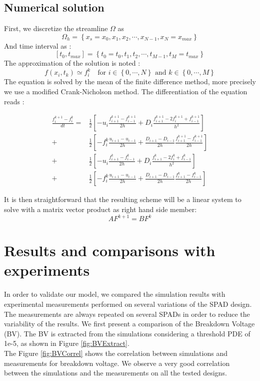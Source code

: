 \documentclass[10pt,a4paper,twocolumn]{article}
\begin{document}
\subsection{Numerical solution}
First, we discretize the streamline $\Omega$ as \[\Omega_h = \left\lbrace x_s = x_0, x_1, x_2, \cdots, x_{N-1}, x_N = x_{max} \right\rbrace \]
And time interval as : 
\[[t_0, t_{max}] = \left\lbrace t_0 = t_0, t_1, t_2, \cdots, t_{M-1}, t_M = t_{max} \right\rbrace \]
The approximation of the solution is noted :
 \[f(x_i, t_k) \simeq f_i^k \: \: \:   \text{    for } i \in \left\lbrace 0, \cdots, N\right\rbrace  \text{ and } k \in \left\lbrace 0, \cdots, M \right\rbrace  \]
The equation is solved by the mean of the finite difference method, more precisely we use a modified Crank-Nicholson method. The differentiation of the equation reads : 
\begin{tiny}
\useshortskip
\begin{align*}\label{eq:CrankNicolson}
\frac{f_i^{k+1} - f_i^{k}}{dt} =& \frac{1}{2} \left[ - u_i \frac{f_{i+1}^{k+1} - f_{i-1}^{k+1}}{2h} 
				+ D_i \frac{f_{i+1}^{k+1} - 2 f_{i}^{k+1} + f_{i-1}^{k+1}}{h^{2}}  \right] \\
				+& \frac{1}{2} \left[-f_i^k \frac{u_{i+1} - u_{i-1} }{2h}
				+ \frac{D_{i+1} - D_{i-1} }{2h} \frac{f_{i+1}^{k+1} - f_{i-1}^{k+1}}{2h} \right] \\ 								
				+ &\frac{1}{2} \left[ - u_i \frac{f_{i+1}^{k} - f_{i-1}^{k}}{2h} 
				+ D_i \frac{f_{i+1}^{k} - 2 f_{i}^{k} + f_{i-1}^{k}}{h^{2}} \right] \\
				+ &\frac{1}{2} \left[-f_i^k \frac{u_{i+1} - u_{i-1} }{2h}
				+ \frac{D_{i+1} - D_{i-1} }{2h} \frac{f_{i+1}^{k} - f_{i-1}^{k}}{2h} \right] \
\end{align*}
\end{tiny}
It is then straightforward that the resulting scheme will be a linear system to solve with a matrix vector product as right hand side member: 
\[ A F^{k+1} = B F^k\]



\section{Results and comparisons with experiments}
In order to validate our model, we compared the simulation results with experimental measurements performed on several variations of the SPAD design. The measurements are always repeated on several SPADs in order to reduce the variability of the results. We first present a comparison of the Breakdown Voltage (BV). The BV is extracted from the simulations considering a threshold PDE of 1e-5, as shown in Figure \ref{fig:BVExtract}. \\
The Figure \ref{fig:BVCorrel} shows the correlation between simulations and measurements for breakdown voltage. We observe a very good correlation between the simulations and the measurements on all the tested designs.
\end{document}
